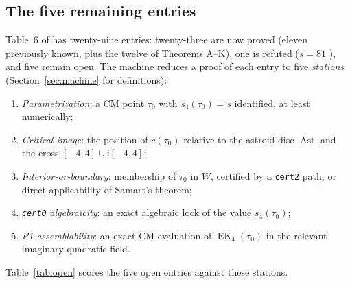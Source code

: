 \documentclass[11pt]{article}
\newcommand{\ii}{\mathrm{i}}
\DeclareMathOperator{\EK}{EK}
\DeclareMathOperator{\Ast}{Ast}
\theoremstyle{definition}
\theoremstyle{remark}
\begin{document}
\subsection{The five remaining entries}\label{subsec:inventory}

Table~6 of \cite{Sa15} has twenty-nine entries: twenty-three are now
proved (eleven previously known, plus the twelve of Theorems
A--K), one is refuted ($s=81$ \cite{Zf2}), and five remain open.
The machine reduces a proof of each entry to five \emph{stations}
(Section~\ref{sec:machine} for definitions):
\begin{enumerate}
\item[\textbf{S1}] \emph{Parametrization}: a CM point $\tau_0$ with
  $s_4(\tau_0)=s$ identified, at least numerically;
\item[\textbf{S2}] \emph{Critical image}: the position of
  $c(\tau_0)$ relative to the astroid disc $\Ast$ and the cross
  $[-4,4]\cup\ii[-4,4]$;
\item[\textbf{S3}] \emph{Interior-or-boundary}: membership of
  $\tau_0$ in $\overline W$, certified by a \texttt{cert2} path,
  or direct applicability of Samart's theorem;
\item[\textbf{S4}] \emph{\texttt{cert0} algebraicity}: an exact
  algebraic lock of the value $s_4(\tau_0)$;
\item[\textbf{S5}] \emph{P1 assemblability}: an exact CM evaluation
  of $\EK_4(\tau_0)$ in the relevant imaginary quadratic field.
\end{enumerate}
Table~\ref{tab:open} scores the five open entries against these
stations.
\end{document}
